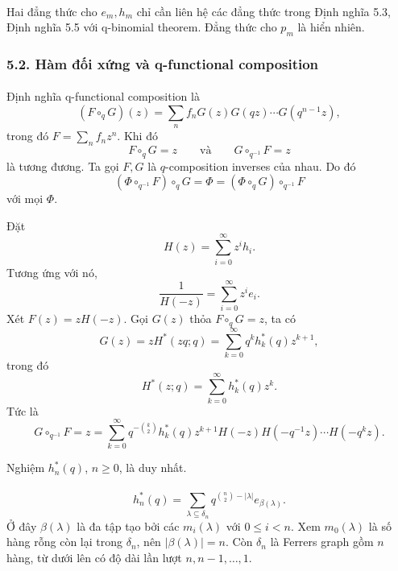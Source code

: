 \documentclass[11pt]{article}
\begin{document}
\paragraph{}
Hai đẳng thức cho \(e_m,h_m\) chỉ cần liên hệ các đẳng thức trong Định nghĩa
5.3, Định nghĩa 5.5 với q-binomial theorem. Đẳng thức cho \(p_m\) là hiển
nhiên.

\subsubsection*{5.2. Hàm đối xứng và q-functional composition}

\paragraph{}
Định nghĩa q-functional composition là
\[
  (F\circ_qG)(z)
  =
  \sum_n f_nG(z)G(qz)\cdots G(q^{n-1}z),
\]
trong đó \(F=\sum_nf_nz^n\). Khi đó
\[
  F\circ_qG=z
  \qquad\text{và}\qquad
  G\circ_{q^{-1}}F=z
\]
là tương đương. Ta gọi \(F,G\) là \(q\)-composition inverses của nhau. Do đó
\[
  (\Phi\circ_{q^{-1}}F)\circ_qG
  =
  \Phi
  =
  (\Phi\circ_qG)\circ_{q^{-1}}F
\]
với mọi \(\Phi\).

Đặt
\[
  H(z)=\sum_{i=0}^{\infty}z^ih_i.
\]
Tương ứng với nó,
\[
  \frac{1}{H(-z)}=\sum_{i=0}^{\infty}z^ie_i.
\]
Xét \(F(z)=zH(-z)\). Gọi \(G(z)\) thỏa \(F\circ_qG=z\), ta có
\[
  G(z)=zH^*(zq;q)=\sum_{k=0}^{\infty}q^kh^*_k(q)z^{k+1},
\]
trong đó
\[
  H^*(z;q)=\sum_{k=0}^{\infty}h^*_k(q)z^k.
\]
Tức là
\[
  G\circ_{q^{-1}}F
  =
  z
  =
  \sum_{k=0}^{\infty}
  q^{-\binom{k}{2}}h^*_k(q)z^{k+1}
  H(-z)H(-q^{-1}z)\cdots H(-q^kz).
\]

Nghiệm \(h^*_n(q)\), \(n\ge0\), là duy nhất.

\paragraph{}
\[
  h^*_n(q)=
  \sum_{\lambda\subseteq\delta_n}
  q^{\binom{n}{2}-|\lambda|}e_{\beta(\lambda)}.
\]
Ở đây \(\beta(\lambda)\) là đa tập tạo bởi các \(m_i(\lambda)\) với
\(0\le i<n\). Xem \(m_0(\lambda)\) là số hàng rỗng còn lại trong
\(\delta_n\), nên \(|\beta(\lambda)|=n\). Còn \(\delta_n\) là Ferrers graph
gồm \(n\) hàng, từ dưới lên có độ dài lần lượt \(n,n-1,\ldots,1\).
\end{document}
